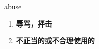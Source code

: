 
\begin{frame}
{\huge abuse}
\begin{center}
\begin{enumerate}\Large
  \item \textbf{辱骂，抨击}
  \item \textbf{不正当的或不合理使用的}
\end{enumerate}
\end{center}
\end{frame}
